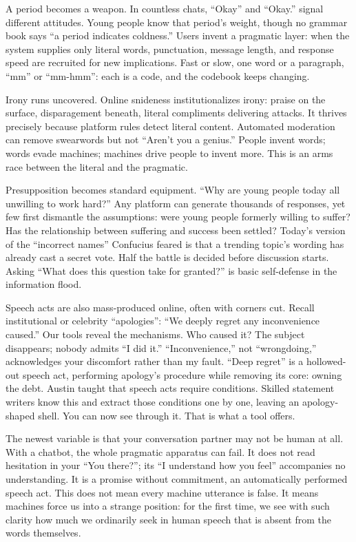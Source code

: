 A period becomes a weapon. In countless chats, ``Okay'' and ``Okay.'' signal different attitudes. Young people know that period's weight, though no grammar book says ``a period indicates coldness.'' Users invent a pragmatic layer: when the system supplies only literal words, punctuation, message length, and response speed are recruited for new implications. Fast or slow, one word or a paragraph, ``mm'' or ``mm-hmm'': each is a code, and the codebook keeps changing.

Irony runs uncovered. Online snideness institutionalizes irony: praise on the surface, disparagement beneath, literal compliments delivering attacks. It thrives precisely because platform rules detect literal content. Automated moderation can remove swearwords but not ``Aren't you a genius.'' People invent words; words evade machines; machines drive people to invent more. This is an arms race between the literal and the pragmatic.

Presupposition becomes standard equipment. ``Why are young people today all unwilling to work hard?'' Any platform can generate thousands of responses, yet few first dismantle the assumptions: were young people formerly willing to suffer? Has the relationship between suffering and success been settled? Today's version of the ``incorrect names'' Confucius feared is that a trending topic's wording has already cast a secret vote. Half the battle is decided before discussion starts. Asking ``What does this question take for granted?'' is basic self-defense in the information flood.

Speech acts are also mass-produced online, often with corners cut. Recall institutional or celebrity ``apologies'': ``We deeply regret any inconvenience caused.'' Our tools reveal the mechanisms. Who caused it? The subject disappears; nobody admits ``I did it.'' ``Inconvenience,'' not ``wrongdoing,'' acknowledges your discomfort rather than my fault. ``Deep regret'' is a hollowed-out speech act, performing apology's procedure while removing its core: owning the debt. Austin taught that speech acts require conditions. Skilled statement writers know this and extract those conditions one by one, leaving an apology-shaped shell. You can now see through it. That is what a tool offers.

The newest variable is that your conversation partner may not be human at all. With a chatbot, the whole pragmatic apparatus can fail. It does not read hesitation in your ``You there?''; its ``I understand how you feel'' accompanies no understanding. It is a promise without commitment, an automatically performed speech act. This does not mean every machine utterance is false. It means machines force us into a strange position: for the first time, we see with such clarity how much we ordinarily seek in human speech that is absent from the words themselves.


